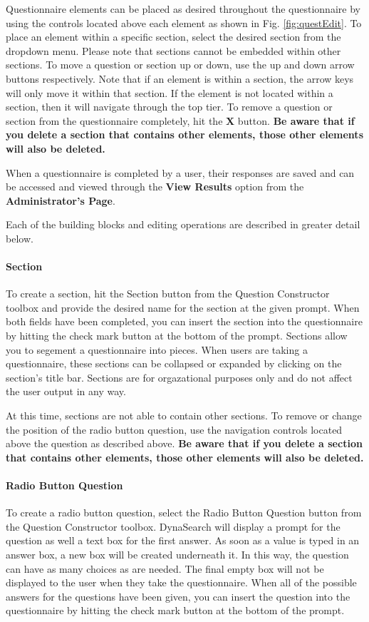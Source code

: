 \documentclass[article]{ij4uq}              %
\begin{document}
Questionnaire elements can be placed as desired throughout the questionnaire by using the controls located above each element as shown in Fig. \ref{fig:questEdit}.  To place an element within a specific section, select the desired section from the dropdown menu.  Please note that sections cannot be embedded within other sections.  To move a question or section up or down, use the up and down arrow buttons respectively.  Note that if an element is within a section, the arrow keys will only move it within that section. If the element is not located within a section, then it will navigate through the top tier.  To remove a question or section from the questionnaire completely, hit the \textbf{X} button.  \textbf{Be aware that if you delete a section that contains other elements, those other elements will also be deleted.}

When a questionnaire is completed by a user, their responses are saved and can be accessed and viewed through the \textbf{View Results} option from the \textbf{Administrator's Page}.

 Each of the building blocks and editing operations are described in greater detail below.

\paragraph{Section}
To create a section, hit the Section button from the Question Constructor toolbox and provide the desired name for the section at the given prompt.  When both fields have been completed, you can insert the section into the questionnaire by hitting the check mark button at the bottom of the prompt.  Sections allow you to segement a questionnaire into pieces.  When users are taking a questionnaire, these sections can be collapsed or expanded by clicking on the section's title bar.  Sections are for orgazational purposes only and do not affect the user output in any way.

At this time, sections are not able to contain other sections.  To remove or change the position of the radio button question, use the navigation controls located above the question as described above. \textbf{Be aware that if you delete a section that contains other elements, those other elements will also be deleted.}

\paragraph{Radio Button Question}
To create a radio button question, select the Radio Button Question button from the Question Constructor toolbox. DynaSearch will display a prompt for the question as well a text box for the first answer.  As soon as a value is typed in an answer box, a new box will be created underneath it.  In this way, the question can have as many choices as are needed.  The final empty box will not be displayed to the user when they take the questionnaire.  When all of the possible answers for the questions have been given, you can insert the question into the questionnaire by hitting the check mark button at the bottom of the prompt.
\end{document}
